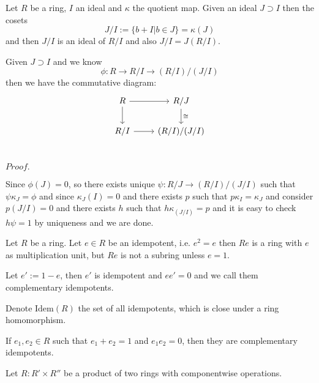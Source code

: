 \documentclass{article}
\newcommand{\Pf}[1]{$Proof.$\par}
\begin{document}
\begin{definition}
    Let $R$ be a ring, $I$ an ideal and $\kappa$ the quotient map. Given an ideal $J\supset I$ then the cosets
    \[
    J/I:=\{b+I|b\in J\} = \kappa(J)
    \]
    and then  $J/I$ is an ideal of $R/I$ and also $J/I = J(R/I)$.
\end{definition}

\begin{proposition}
    Given $J\supset I$ and we know
    \[
    \phi:R\to R/I\to (R/I)/(J/I)
    \]
    then we have the commutative diagram:
    \[
    \begin{tikzcd}
        R\arrow[r]\arrow[d] & R/J\arrow[d,"\cong"] \\
        R/I\arrow[r] & (R/I)/(J/I) \\
    \end{tikzcd}
    \]
\end{proposition}
\Pf\par
    Since $\phi(J) = 0$, so there exists unique $\psi:R/J \to (R/I)/(J/I)$ such that $\psi\kappa_J =\phi$ and since $\kappa_J(I) = 0$ and there exists $p$ such that $p\kappa_I = \kappa_J$ and consider $p(J/I) = 0$ and there exists $h$ such that $h\kappa_{(J/I)} = p$ and it is easy to check $h\psi = 1$ by uniqueness and we are done.

\begin{definition}\par
    Let $R$ be a ring. Let $e\in R$ be an idempotent, i.e. $e^2 = e$ then $Re$ is a ring with $e$ as multiplication unit, but $Re$ is not a subring unless $e=1$.\par
    Let $e':= 1-e$, then $e'$ is idempotent and $ee' = 0$ and we call them complementary idempotents.\par
    Denote $\text{Idem}(R)$ the set of all idempotents, which is close under a ring homomorphism.
\end{definition}

\begin{proposition}
    If $e_1,e_2\in R$ such that $e_1+e_2 = 1$ and $e_1e_2 =0$, then they are complementary idempotents.
\end{proposition}

\begin{definition}
    Let $R:R'\times R''$ be a product of two rings with componentwise operations.
\end{definition}
\end{document}
